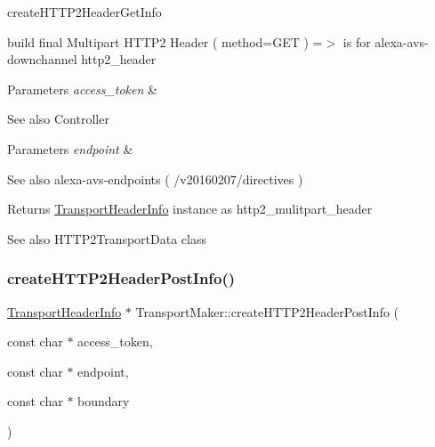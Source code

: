 create\+H\+T\+T\+P2\+Header\+Get\+Info 

build final Multipart H\+T\+T\+P2 Header ( method=G\+ET ) =$>$ is for alexa-\/avs-\/downchannel http2\+\_\+header 
\begin{DoxyParams}{Parameters}
{\em access\+\_\+token} & \\
\hline
\end{DoxyParams}
\begin{DoxySeeAlso}{See also}
Controller 
\end{DoxySeeAlso}

\begin{DoxyParams}{Parameters}
{\em endpoint} & \\
\hline
\end{DoxyParams}
\begin{DoxySeeAlso}{See also}
alexa-\/avs-\/endpoints ( /v20160207/directives ) 
\end{DoxySeeAlso}
\begin{DoxyReturn}{Returns}
\hyperlink{classAlexaEvent_1_1TransportHeaderInfo}{Transport\+Header\+Info} instance as http2\+\_\+mulitpart\+\_\+header 
\end{DoxyReturn}
\begin{DoxySeeAlso}{See also}
H\+T\+T\+P2\+Transport\+Data class 
\end{DoxySeeAlso}
\mbox{\label{classAlexaEvent_1_1TransportMaker_ab6d4564a95177c10e341a13938b256a8}} 
\subsubsection{\texorpdfstring{create\+H\+T\+T\+P2\+Header\+Post\+Info()}{createHTTP2HeaderPostInfo()}}
{\footnotesize\ttfamily \hyperlink{classAlexaEvent_1_1TransportHeaderInfo}{Transport\+Header\+Info} $\ast$ Transport\+Maker\+::create\+H\+T\+T\+P2\+Header\+Post\+Info (\begin{DoxyParamCaption}\item[{const char $\ast$}]{access\+\_\+token,  }\item[{const char $\ast$}]{endpoint,  }\item[{const char $\ast$}]{boundary }\end{DoxyParamCaption})}



